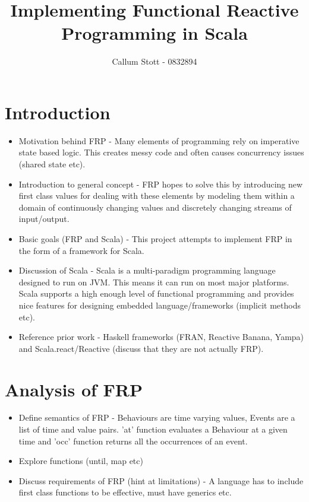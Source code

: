 \documentclass{article}
\begin{document}
  \title{Implementing Functional Reactive Programming in Scala}
  \author{Callum Stott - 0832894}
  \maketitle
  \newpage
  \twocolumn
  \section{Introduction}
   \begin{itemize}
     \item Motivation behind FRP -
      Many elements of programming rely on imperative state based logic. This creates
      messy code and often causes concurrency issues (shared state etc).
     \item Introduction to general concept - 
     FRP hopes to solve this by introducing new first class values for dealing with
     these elements by modeling them within a domain of continuously changing values
     and discretely changing streams of input/output.
     \item Basic goals (FRP and Scala) - 
     This project attempts to implement FRP in the form of a framework for Scala.
     \item Discussion of Scala - 
     Scala is a multi-paradigm programming language designed to run on JVM. This 
     means it can run on most major platforms. Scala supports a high enough level
     of functional programming and provides nice features for designing embedded
     language/frameworks (implicit methods etc).
     \item Reference prior work - 
     Haskell frameworks (FRAN, Reactive Banana, Yampa) and Scala.react/Reactive
     (discuss that they are not actually FRP).
   \end{itemize}
  \section{Analysis of FRP}
    \begin{itemize}
      \item Define semantics of FRP - 
      Behaviours are time varying values, Events are a list of time and value pairs.
      'at' function evaluates a Behaviour at a given time and 'occ' function returns 
      all the occurrences of an event.
      \item Explore functions (until, map etc)
      \item Discuss requirements of FRP (hint at limitations) - 
      A language has to include first class functions to be effective, must have
      generics etc.
    \end{itemize}
\end{document}
